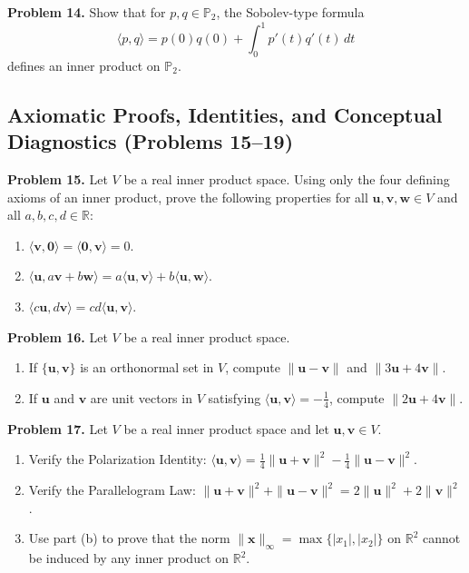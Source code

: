 \documentclass[11pt, letterpaper]{article}
\theoremstyle{definition}
\theoremstyle{remark}
\begin{document}
\textbf{Problem 14.} Show that for $p, q \in \mathbb{P}_2$, the Sobolev-type formula
\[
\langle p, q \rangle = p(0)q(0) + \int_0^1 p'(t)q'(t)\,dt
\]
defines an inner product on $\mathbb{P}_2$.

\subsection{Axiomatic Proofs, Identities, and Conceptual Diagnostics (Problems 15--19)}

\textbf{Problem 15.} Let $V$ be a real inner product space. Using only the four defining axioms of an inner product, prove the following properties for all $\mathbf{u}, \mathbf{v}, \mathbf{w} \in V$ and all $a, b, c, d \in \mathbb{R}$:
\begin{enumerate}[label=(\alph*)]
    \item $\langle \mathbf{v}, \mathbf{0} \rangle = \langle \mathbf{0}, \mathbf{v} \rangle = 0$.
    \item $\langle \mathbf{u}, a\mathbf{v} + b\mathbf{w} \rangle = a\langle \mathbf{u}, \mathbf{v} \rangle + b\langle \mathbf{u}, \mathbf{w} \rangle$.
    \item $\langle c\mathbf{u}, d\mathbf{v} \rangle = cd\langle \mathbf{u}, \mathbf{v} \rangle$.
\end{enumerate}

\textbf{Problem 16.} Let $V$ be a real inner product space.
\begin{enumerate}[label=(\alph*)]
    \item If $\{\mathbf{u}, \mathbf{v}\}$ is an orthonormal set in $V$, compute $\|\mathbf{u} - \mathbf{v}\|$ and $\|3\mathbf{u} + 4\mathbf{v}\|$.
    \item If $\mathbf{u}$ and $\mathbf{v}$ are unit vectors in $V$ satisfying $\langle \mathbf{u}, \mathbf{v} \rangle = -\frac{1}{4}$, compute $\|2\mathbf{u} + 4\mathbf{v}\|$.
\end{enumerate}

\textbf{Problem 17.} Let $V$ be a real inner product space and let $\mathbf{u}, \mathbf{v} \in V$.
\begin{enumerate}[label=(\alph*)]
    \item Verify the Polarization Identity: $\langle \mathbf{u}, \mathbf{v} \rangle = \frac{1}{4}\|\mathbf{u} + \mathbf{v}\|^2 - \frac{1}{4}\|\mathbf{u} - \mathbf{v}\|^2$.
    \item Verify the Parallelogram Law: $\|\mathbf{u} + \mathbf{v}\|^2 + \|\mathbf{u} - \mathbf{v}\|^2 = 2\|\mathbf{u}\|^2 + 2\|\mathbf{v}\|^2$.
    \item Use part (b) to prove that the norm $\|\mathbf{x}\|_\infty = \max\{|x_1|, |x_2|\}$ on $\mathbb{R}^2$ cannot be induced by any inner product on $\mathbb{R}^2$.
\end{enumerate}
\end{document}
